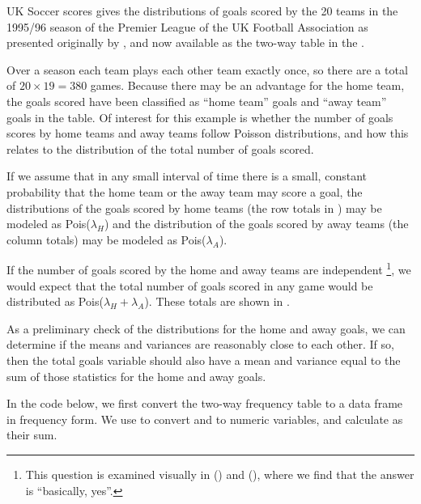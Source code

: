 \documentclass[10pt,krantz2]{krantz}\usepackage[]{graphicx}\usepackage[]{color}
\begin{document}
\begin{Example}[soccer]{UK Soccer scores}
  gives the distributions of goals scored by
the 20 teams in the  1995/96 season of the
 Premier League of the UK Football Association
as presented originally by
\citet{Lee:97}, and now available as the two-way table 
in the .

Over a season
each team plays each other team exactly once, so there are a total of
$20 \times 19 = 380$ games.
Because there may be an advantage for the home team,
the goals scored have been classified as ``home team'' goals
and ``away team'' goals in the table. Of interest for this example is whether
the number of goals scores by home teams and away teams follow
Poisson distributions, and how this relates to the distribution of the
total number of goals scored.

If we assume that in any small interval of time there is a small, constant
probability that the home team or the away team may score a goal,
the distributions of the goals scored by home teams
(the row totals in )
may be modeled as Pois($\lambda_H$) and the distribution of
the goals scored by away teams (the column totals)
may be modeled as Pois($\lambda_A$).

If the number of goals scored by the home and away teams are independent%
\footnote{This question
is examined visually in  ()
and  (), where we find that the answer
is ``basically, yes''.},
we would expect that the total number of goals scored in any
game would be distributed as Pois($\lambda_H + \lambda_A$).
These totals are shown in .


As a preliminary check of the distributions for the home and away goals,
we can determine if the means and variances are reasonably close
to each other.
If so, then the total goals variable should also have a mean and variance
equal to the sum of those statistics for the home and away goals.

In the \R code below, we first convert the two-way frequency table
 to a data frame in frequency form.
We use  to convert  and  to
numeric variables, and calculate  as their sum.


\end{Example}
\end{document}
